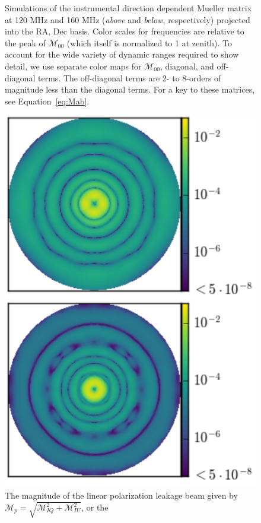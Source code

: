 \documentclass[twocolumn, trackchanges]{aastex61}
\begin{document}
\begin{figure}
\caption{Simulations of the instrumental direction dependent Mueller matrix at
  120 MHz and 160 MHz (\textit{above} and \textit{below}, respectively)
  projected into the RA, Dec basis. Color scales for frequencies are relative to
  the peak of $\mathcal{M}_{00}$ (which itself is normalized to 1 at zenith). To
  account for the wide variety of dynamic ranges required to show detail, we use
  separate color maps for $\mathcal{M}_{00}$, diagonal, and off-diagonal
  terms. The off-diagonal terms are 2- to 8-orders of magnitude less than the
  diagonal terms. For a key to these matrices, see Equation~\ref{eq:Mab}.  }
\label{fig:mueller}
\end{figure}

\begin{figure}
\centering
\hspace{-0.5cm}
\includegraphics[scale=0.6]{M_p.pdf}
\caption{The magnitude of the linear polarization leakage beam given by
    $\mathcal{M}_p = \sqrt{\mathcal{M}_{IQ}^2 + \mathcal{M}_{IU}^2}$, or the
}
\end{figure}
\end{document}

